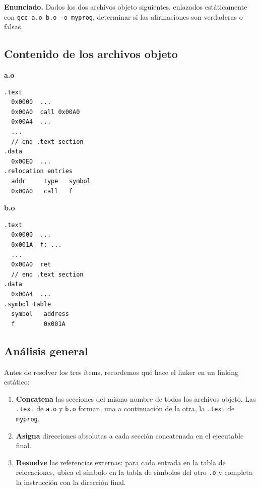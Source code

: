 \documentclass[11pt,a4paper]{article}
\begin{document}
\textbf{Enunciado.} Dados los dos archivos objeto siguientes,
enlazados estáticamente con \texttt{gcc a.o b.o -o myprog}, determinar
si las afirmaciones son verdaderas o falsas.

\subsection*{Contenido de los archivos objeto}

\begin{center}
\begin{minipage}[t]{0.46\textwidth}
\textbf{a.o}
\begin{lstlisting}[style=textstyle]
.text
  0x0000  ...
  0x00A0  call 0x00A0
  0x00A4  ...
  ...
  // end .text section
.data
  0x00E0  ...
.relocation entries
  addr     type   symbol
  0x00A0   call   f
\end{lstlisting}
\end{minipage}
\hfill
\begin{minipage}[t]{0.46\textwidth}
\textbf{b.o}
\begin{lstlisting}[style=textstyle]
.text
  0x0000  ...
  0x001A  f: ...
  ...
  0x00A0  ret
  // end .text section
.data
  0x00A4  ...
.symbol table
  symbol   address
  f        0x001A
\end{lstlisting}
\end{minipage}
\end{center}

\subsection*{Análisis general}

Antes de resolver los tres ítems, recordemos qué hace el linker en un
linking estático:

\begin{enumerate}[leftmargin=*,nosep]
    \item \textbf{Concatena} las secciones del mismo nombre de todos
        los archivos objeto. Las \texttt{.text} de \texttt{a.o} y
        \texttt{b.o} forman, una a continuación de la otra, la
        \texttt{.text} de \texttt{myprog}.
    \item \textbf{Asigna} direcciones absolutas a cada sección
        concatenada en el ejecutable final.
    \item \textbf{Resuelve} las referencias externas: para cada
        entrada en la tabla de relocaciones, ubica el símbolo en la
        tabla de símbolos del otro \texttt{.o} y completa la
        instrucción con la dirección final.
\end{enumerate}
\end{document}
